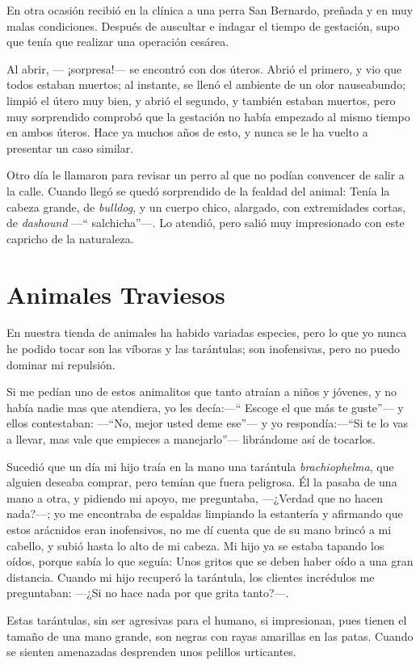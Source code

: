 \documentclass[letterpaper, 12pt]{book}
\begin{document}
En otra ocasión recibió en la clínica a una perra San Bernardo, preñada y en muy malas condiciones. Después de auscultar e indagar el tiempo de gestación, supo que tenía que realizar una operación cesárea.

Al abrir, --- ¡sorpresa!--- se encontró con dos úteros. Abrió el primero, y vio que todos estaban muertos; al instante, se llenó el ambiente de un olor nauseabundo; limpió el útero muy bien, y abrió el segundo, y también estaban muertos, pero muy sorprendido comprobó que la gestación no había empezado al mismo tiempo en ambos úteros. Hace ya muchos años de esto, y nunca se le ha vuelto a presentar un caso similar.

Otro día le llamaron para revisar un perro al que no podían convencer de salir a la calle. Cuando llegó se quedó sorprendido de la fealdad del animal: Tenía la cabeza grande, de \textit{bulldog}, y un cuerpo chico, alargado, con extremidades cortas, de \textit{dashound} ---`` salchicha''---. Lo atendió, pero salió muy impresionado con este capricho de la naturaleza.
\chapter{Animales Traviesos}
En nuestra tienda de animales ha habido variadas especies, pero lo que yo nunca he podido tocar son las víboras y las tarántulas; son inofensivas, pero no puedo dominar mi repulsión.

Si me pedían uno de estos animalitos que tanto atraían a niños y jóvenes, y no había nadie mas que atendiera, yo les decía:---`` Escoge el que más te guste''--- y ellos contestaban: ---``No, mejor usted deme ese''--- y yo respondía:---``Si te lo vas a llevar, mas vale que empieces a manejarlo''--- librándome así de tocarlos.

Sucedió que un día mi hijo traía en la mano una tarántula \textit{brachiophelma}, que alguien deseaba comprar, pero temían que fuera peligrosa. Él la pasaba de una mano a otra, y pidiendo mi apoyo, me preguntaba, ---¿Verdad que no hacen nada?---; yo me encontraba de espaldas limpiando la estantería y afirmando que estos arácnidos eran inofensivos, no me dí cuenta que de su mano brincó a mi cabello, y subió hasta lo alto de mi cabeza. Mi hijo ya se estaba tapando los oídos, porque sabía lo que seguía: Unos gritos que se deben haber oído a una gran distancia. Cuando mi hijo recuperó la tarántula, los clientes incrédulos me preguntaban: ---¿Si no hace nada por que grita tanto?---.

Estas tarántulas, sin ser agresivas para el humano, si impresionan, pues tienen el tamaño de una mano grande, son negras con rayas amarillas en las patas. Cuando se sienten amenazadas desprenden unos pelillos urticantes.
\end{document}
